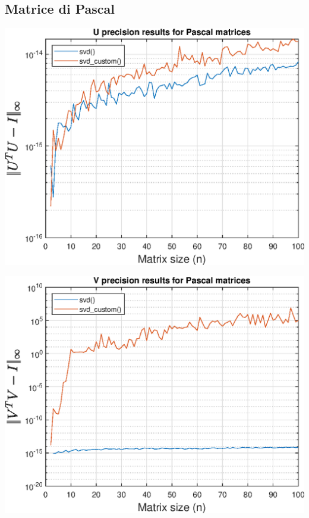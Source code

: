 \subsection{Matrice di Pascal}
\centering
\includegraphics[scale=.9]{imgs/07_-_U_precision_results_for_Pascal_matrices.eps} \\
\par \vspace{15pt}
\includegraphics[scale=.9]{imgs/08_-_V_precision_results_for_Pascal_matrices.eps} \\
\newpage
